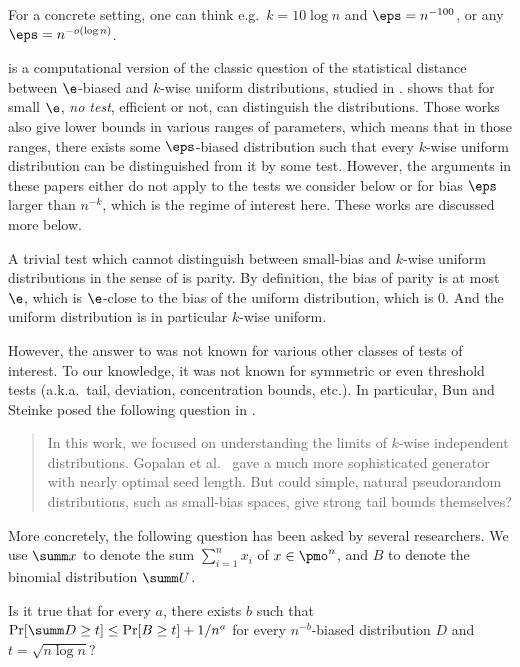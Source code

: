 For a concrete setting, one can think e.g.~$k = 10 \log n$ and $\eps = n^{-100}$, or any $\eps = n^{-o(\log n)}$.

 is a computational version of the classic question of the statistical distance between $\e$-biased and $k$-wise uniform distributions, studied in \cite{AGM03,AlonAKMRX07,OZ18}.  shows that for small $\e$, \emph{no test}, efficient or not, can distinguish the distributions.  Those works also give lower bounds in various ranges of parameters, which means that in those ranges, there exists some $\eps$-biased distribution such that every $k$-wise uniform distribution can be distinguished from it by some test.  However, the arguments in these papers either do not apply to the tests we consider below or for bias $\eps$ larger than $n^{-k}$, which is the regime of interest here.  These works are discussed more below.

A trivial test which cannot distinguish between small-bias and $k$-wise uniform distributions in the sense of  is parity.  By definition, the bias of parity is at most $\e$, which is $\e$-close to the bias of the uniform distribution, which is $0$.  And the uniform distribution is in particular $k$-wise uniform.

However, the answer to  was not known for various other classes of tests of interest.
To our knowledge, it was not known for symmetric or even threshold tests (a.k.a.~tail, deviation, concentration bounds, etc.).
In particular, Bun and Steinke posed the following question in \cite{BS15}.

\begin{quote}
  In this work, we focused on understanding the limits of $k$-wise independent distributions. Gopalan et al.~\cite{GopalanKM15} gave a much more sophisticated generator with nearly optimal seed length. But could simple, natural pseudorandom distributions, such as small-bias spaces, give strong tail bounds themselves?
\end{quote}
More concretely, the following question has been asked by several researchers.
We use $\summ x$ to denote the sum $\sum_{i=1}^n x_i$ of $x \in \pmo^n$, and $B$ to denote the binomial distribution $\summ U$.

\begin{question}\label{question:BS}
  Is it true that for every $a$, there exists $b$ such that $\Pr[\summ D \ge t] \le \Pr[B \ge t] + 1/n^a$ for every $n^{-b}$-biased distribution $D$ and $t = \sqrt{n \log n}$?
\end{question}

